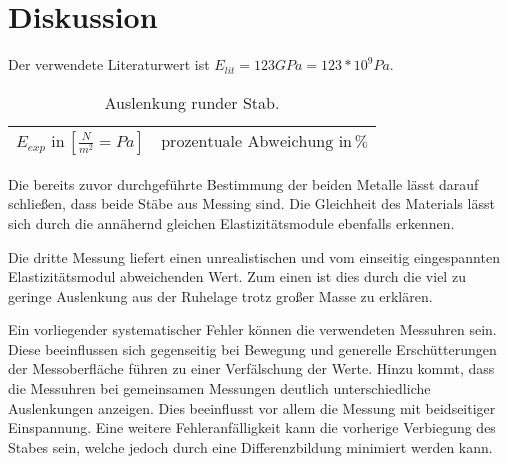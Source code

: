 \newpage
\section{Diskussion}
\label{sec:Diskussion}
Der verwendete Literaturwert ist $E_{lit} = 123 GPa = 123*10^9 Pa$\cite{litval}.
\begin{table}[h]
  \centering
  \label{tab:lit5}
  \begin{tabular}{ c c  }
    \toprule
    $E_{exp} \,\, \text{in} \, [\frac{N}{m^2}= Pa]$
   &{$\text{prozentuale Abweichung}\,\, \text{in} \, \% $} \\

    \midrule


    \bottomrule
  \end{tabular}
  \caption{Auslenkung runder Stab.}
\end{table}


Die bereits zuvor durchgeführte Bestimmung der beiden Metalle lässt darauf
schließen, dass beide Stäbe aus Messing sind. Die Gleichheit des Materials
lässt sich durch die annähernd gleichen Elastizitätsmodule ebenfalls
erkennen.

Die dritte Messung liefert einen unrealistischen und vom einseitig
eingespannten Elastizitätsmodul abweichenden Wert. Zum einen ist dies durch die viel zu geringe Auslenkung
aus der Ruhelage trotz großer Masse zu erklären.

Ein vorliegender systematischer Fehler können die verwendeten Messuhren sein.
Diese beeinflussen sich gegenseitig bei Bewegung und generelle Erschütterungen
der Messoberfläche führen zu einer Verfälschung der Werte. Hinzu kommt, dass
die Messuhren bei gemeinsamen Messungen deutlich unterschiedliche Auslenkungen
anzeigen. Dies beeinflusst vor allem die Messung mit beidseitiger
Einspannung.
Eine weitere Fehleranfälligkeit kann die vorherige Verbiegung des Stabes
sein, welche jedoch durch eine Differenzbildung minimiert werden kann.
